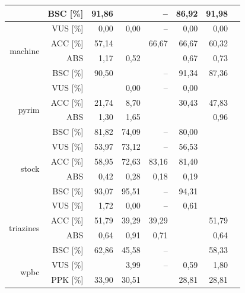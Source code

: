 \documentclass{mini}
\begin{document}
\begin{table}[!htbp]
\begin{tabular}{rrrrrrrr}
   & BSC [\%] & 91,86 & \color{red}{92,25} & -- & 86,92 & 91,98 &\color{gray}{51,15}\\ 
   \hline
\multirow{4}{15mm}{machine} & VUS [\%] & 0,00 & 0,00 & -- & 0,00 & 0,00 &\color{gray}{0,00}\\ 
   & ACC [\%] & 57,14 & \color{red}{68,25} & 66,67 & 66,67 & 60,32 &\color{gray}{69,84}\\ 
   & ABS \color{white}{[\%]} & 1,17 & 0,52 & \color{red}{0,51} & 0,67 & 0,73 &\color{gray}{0,48}\\ 
   & BSC [\%] & 90,50 & \color{red}{92,87} & -- & 91,34 & 87,36 &\color{gray}{29,20}\\ 
   \hline
\multirow{4}{15mm}{pyrim} & VUS [\%] & \color{red}{0,74} & 0,00 & -- & 0,00 & \color{red}{0,74} &\color{gray}{0,00}\\ 
   & ACC [\%] & 21,74 & 8,70 & \color{red}{52,17} & 30,43 & 47,83 &\color{gray}{47,83}\\ 
   & ABS \color{white}{[\%]} & 1,30 & 1,65 & \color{red}{0,91} & \color{red}{0,91} & 0,96 &\color{gray}{0,87}\\ 
   & BSC [\%] & 81,82 & 74,09 & -- & 80,00 & \color{red}{82,73} &\color{gray}{61,82}\\ 
   \hline
\multirow{4}{15mm}{stock} & VUS [\%] & 53,97 & 73,12 & -- & 56,53 & \color{red}{96,01} &\color{gray}{0,01}\\ 
   & ACC [\%] & 58,95 & 72,63 & 83,16 & 81,40 & \color{red}{91,58} &\color{gray}{86,67}\\ 
   & ABS \color{white}{[\%]} & 0,42 & 0,28 & 0,18 & 0,19 & \color{red}{0,08} &\color{gray}{0,14}\\ 
   & BSC [\%] & 93,07 & 95,51 & -- & 94,31 & \color{red}{99,42} &\color{gray}{50,69}\\ 
   \hline
\multirow{4}{15mm}{triazines} & VUS [\%] & 1,72 & 0,00 & -- & 0,61 & \color{red}{1,83}&\color{gray}{0,00} \\ 
   & ACC [\%] & 51,79 & 39,29 & 39,29 & \color{red}{53,57} & 51,79 &\color{gray}{44,64}\\ 
   & ABS \color{white}{[\%]} & 0,64 & 0,91 & 0,71 & \color{red}{0,61} & 0,64 &\color{gray}{0,88}\\ 
   & BSC [\%] & 62,86 & 45,58 & -- & \color{red}{66,46} & 58,33 &\color{gray}{42,49}\\ 
   \hline
\multirow{4}{15mm}{wpbc} & VUS [\%] & \color{red}{4,44} & 3,99 & -- & 0,59 & 1,80 &\color{gray}{0,00}\\ 
   & PPK [\%] & 33,90 & 30,51 & \color{red}{35,59} & 28,81 & 28,81 &\color{gray}{25,42}\\ 

\end{tabular}
\end{table}
\end{document}
